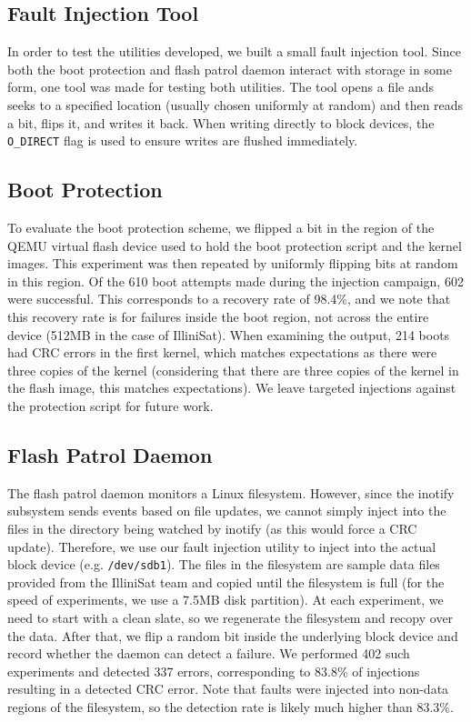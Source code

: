 \subsection{Fault Injection Tool}

In order to test the utilities developed, we built a small fault injection
tool.  Since both the boot protection and flash patrol daemon interact with
storage in some form, one tool was made for testing both utilities.  The tool
opens a file ands seeks to a specified location (usually chosen uniformly at
random) and then reads a bit, flips it, and writes it back.  When writing
directly to block devices, the {\texttt {O\_DIRECT}} flag is used to ensure
writes are flushed immediately.

\subsection{Boot Protection}
To evaluate the boot protection scheme, we flipped a bit in the region of the
QEMU virtual flash device used to hold the boot protection script and the kernel
images.  This experiment was then repeated by uniformly flipping bits at random
in this region.  Of the 610 boot attempts made during the injection campaign,
602 were successful.  This corresponds to a recovery rate of 98.4\%, and we note
that this recovery rate is for failures inside the boot region, not across the
entire device (512MB in the case of IlliniSat).  When examining the output, 214
boots had CRC errors in the first kernel, which matches expectations as there
were three copies of the kernel (considering that there are three copies of the
kernel in the flash image, this matches expectations).  We leave targeted
injections against the protection script for future work.

\subsection{Flash Patrol Daemon}
The flash patrol daemon monitors a Linux filesystem.  However, since the
inotify subsystem sends events based on file updates, we cannot simply
inject into the files in the directory being watched by inotify (as this would
force a CRC update). Therefore, we use our fault injection utility to inject
into the actual block device (e.g.  \texttt{/dev/sdb1}).  The files in the
filesystem are sample data files provided from the IlliniSat team and copied
until the filesystem is full (for the speed of experiments, we use a 7.5MB disk
partition).  At each experiment, we need to start with a clean slate, so we
regenerate the filesystem and recopy over the data.  After that, we flip a
random bit inside the underlying block device and record whether the daemon can
detect a failure.  We performed 402 such experiments and detected 337 errors,
corresponding to 83.8\% of injections resulting in a detected CRC error.
Note that faults were injected into non-data regions of the filesystem, so the
detection rate is likely much higher than 83.3\%.

